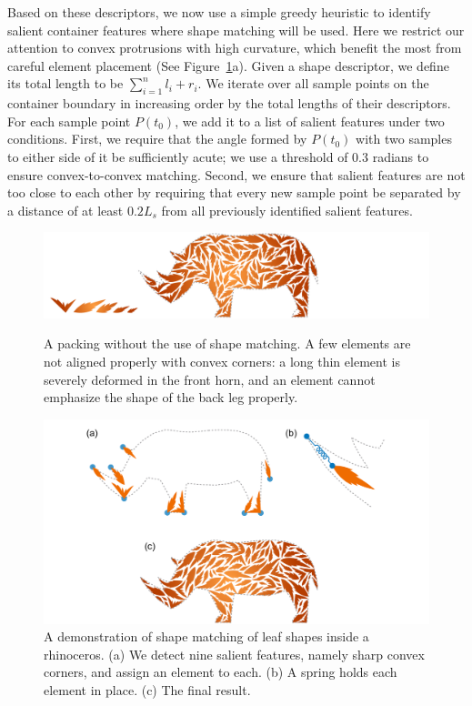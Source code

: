 Based on these descriptors, we now use a simple greedy heuristic to identify salient container features where shape matching will be used.
Here we restrict our attention to convex protrusions with high curvature, which benefit the most from careful element placement (See Figure~\ref{rhino_packing}a).  Given a shape descriptor, we define its total length to be $\sum_{i=1}^nl_i+r_i$.  We iterate over all sample points on the container boundary in increasing order by the total lengths of their descriptors.  For each sample point $P(t_0)$, we add it to a list of salient features under two conditions. First, we require that the angle formed by $P(t_0)$ with two samples to either side of it be sufficiently acute; we use a threshold of 0.3 radians to ensure convex-to-convex matching.
Second, we ensure that salient features are not too close to each other by requiring that every new sample point be separated by a distance of at least $0.2L_s$ from all previously identified salient features.


\begin{figure}%
\centering
\includegraphics[width=1.0\textwidth]{figures/repulsionpak/rhino_bad.pdf}
\caption[A packing without the use of shape matching]{
  \label{rhino_bad}
  \nnewtext
  {
  A packing without the use of shape matching. 
A few elements are not aligned properly with convex corners: a long thin element is severely deformed in the front horn, 
and an element cannot emphasize the shape of the back leg properly.}
}
\centering
\includegraphics[width=1.0\textwidth]{figures/repulsionpak/rhino_shape_matching_bitmap_2.pdf} 
\caption[A demonstration of shape matching to place elements]
{\label{rhino_packing}
{ 
A demonstration of shape matching of leaf shapes inside a rhinoceros. 
(a) We detect nine salient features, namely sharp convex corners, and 
assign an element to each.
(b) A spring holds each element in place.
(c) The final result.
}
}
\end{figure}

